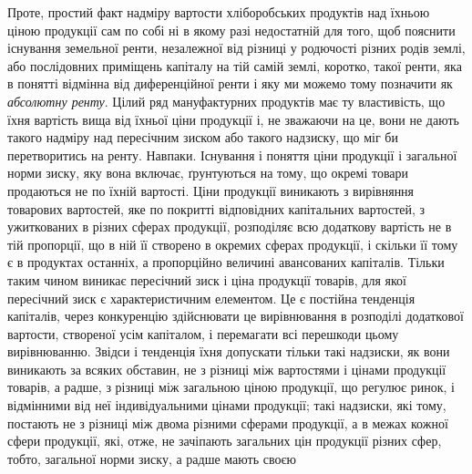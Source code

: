Проте, простий факт надміру вартости хліборобських продуктів над їхньою ціною продукції сам по
собі ні в якому разі недостатній для того, щоб пояснити існування земельної ренти, незалежної від
різниці у родючості різних родів землі, або послідовних приміщень капіталу на тій самій землі,
коротко, такої ренти, яка в понятті відмінна від диференційної ренти і яку ми можемо тому позначити
як \emph{абсолютну ренту}. Цілий ряд мануфактурних продуктів має ту властивість, що їхня вартість вища від
їхньої ціни продукції і, не зважаючи на це, вони не дають такого надміру над пересічним зиском або
такого надзиску, що міг би перетворитись на ренту. Навпаки. Існування і поняття ціни продукції і
загальної норми зиску, яку вона включає, ґрунтуються на тому, що окремі товари продаються не по
їхній вартості. Ціни продукції виникають з вирівняння товарових вартостей, яке по покритті
відповідних капітальних вартостей, з ужиткованих в різних сферах продукції, розподіляє всю додаткову
вартість не в тій пропорції, що в ній її створено в окремих сферах продукції, і скільки її тому є в
продуктах останніх, а пропорційно величині авансованих капіталів. Тільки таким чином виникає
пересічний зиск і ціна продукції товарів, для якої пересічний зиск є характеристичним елементом. Це
є постійна тенденція капіталів, через конкуренцію здійснювати це вирівнювання в розподілі додаткової
вартости, створеної усім капіталом, і перемагати всі перешкоди цьому
вирівнюванню. Звідси і тенденція їхня допускати тільки такі надзиски, як вони виникають за всяких
обставин, не з різниці між вартостями і цінами продукції товарів, а радше, з різниці між загальною
ціною продукції, що регулює ринок, і відмінними від неї індивідуальними цінами продукції; такі
надзиски, які тому, постають не з різниці між двома різними сферами продукції, а в межах кожної
сфери продукції, які, отже, не зачіпають загальних цін продукції різних сфер, тобто, загальної норми
зиску, а радше мають своєю
\parbreak{}  %
